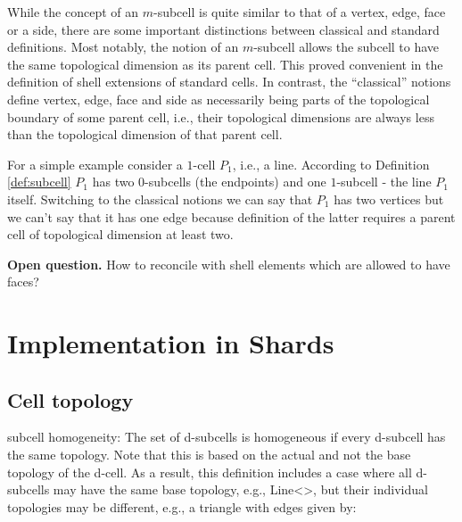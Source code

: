 \documentclass[pdf,12pt,relaxed]{SANDreport}
\begin{document}
While the concept of an $m$-subcell is quite similar to that of a vertex, edge, face or a side, there are some important distinctions between classical and standard definitions. Most notably, the notion of an $m$-subcell allows the subcell to have the same topological dimension as its parent cell. This proved convenient in the definition of shell extensions of standard cells. 
In contrast, the ``classical'' notions define vertex, edge, face and side as necessarily being parts of the topological boundary of some parent cell, i.e., their topological dimensions are always less than the topological dimension of that parent cell.

For a simple example consider a $1$-cell $P_1$, i.e., a line. According to Definition \ref{def:subcell} $P_1$ has two $0$-subcells (the endpoints) and one $1$-subcell - the line $P_1$ itself. Switching to the classical notions we can say 
that $P_1$ has two vertices but we can't say that  it has one edge because definition of the latter requires a parent cell of topological dimension at least two.



\textbf{Open question.} How to reconcile with shell elements which are allowed to have faces?





    
    
    \section{Implementation in Shards}\label{sec:implementation}
    
    
        
    
    \subsection{Cell topology}
   
    
    
    subcell homogeneity: The set of d-subcells is homogeneous if every d-subcell has the same topology.
    Note that this is based on the actual and not the base topology of the d-cell. As a result, this definition includes a case where all d-subcells may have the same base topology, e.g., Line<>, but their individual topologies may be different, e.g., a triangle with edges given by:
\end{document}
